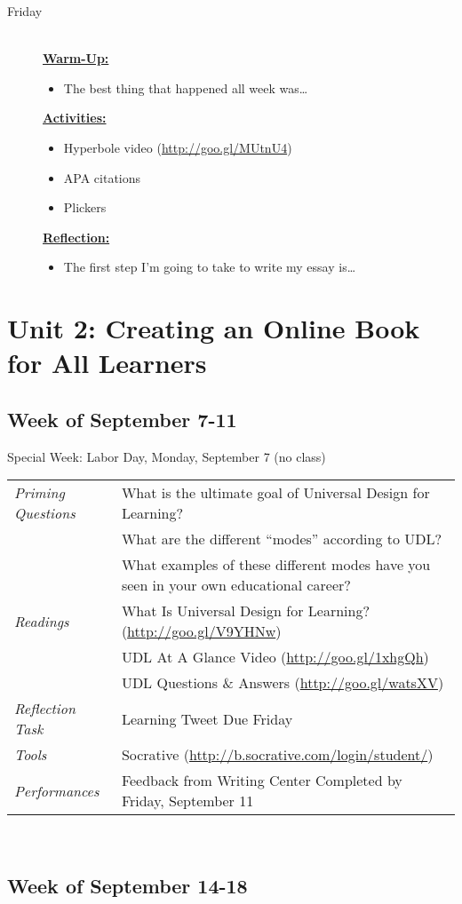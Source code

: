 \documentclass{tufte-handout}
\newcommand{\tabpq}{\faQuestionCircle\medspace\textit{Priming Questions}}
\newcommand{\tabread}{\faBook\medspace\textit{Readings}}
\newcommand{\tabperformance}{\faTasks\medspace\textit{Performances}}
\newcommand{\tabtools}{\faWrench\medspace\textit{Tools}}
\newcommand{\tabtweet}{\faLightbulbO\medspace\textit{Reflection Task} & Learning Tweet Due Friday \\}
\newenvironment{tabsched}
	{\small
	\begin{tabular}{p{1.5in}p{4.5in}}
	\toprule}
	{\bottomrule
	\end{tabular}
	\normalsize\\}
\newenvironment{specweek}
	{\begin{center}
		\fontseries{b} \faBullhorn \medspace Special Week: }
		{\medspace \faBullhorn \fontseries{m}
	\end{center}}
\newcommand{\weekfour}{September 7-11}
\newcommand{\weekfive}{September 14-18}
\newcommand{\laborday}{Labor Day, Monday, September 7 (no class)}
\newcommand{\listfri}{\item[Friday] \hfill \\}
\newenvironment{daywu}
	{\textbf{\underline{Warm-Up:}} \hfill \\
	\begin{itemize}}
	{\end{itemize}}
\newenvironment{dayact}
	{\textbf{\underline{Activities:}} \hfill \\
	\begin{itemize}}
	{\end{itemize}}
\newenvironment{dayref}
	{\textbf{\underline{Reflection:}} \hfill \\
	\begin{itemize}}
	{\end{itemize}}
\newenvironment{weeksched}
	{\noindent
	\begin{description}}
	{\end{description}
	\newpage}
\begin{document}
\begin{fullwidth}
\begin{weeksched}
\listfri
	\begin{daywu}
		\item The best thing that happened all week was\ldots
	\end{daywu}
	\begin{dayact}
		\item Hyperbole video (\url{http://goo.gl/MUtnU4})
		\item APA citations
		\item Plickers
	\end{dayact}
	\begin{dayref}
		\item The first step I'm going to take to write my essay is\ldots
	\end{dayref}
\end{weeksched}

\section{Unit 2: Creating an Online Book for All Learners}

\subsection{Week of \weekfour}

\begin{specweek}\laborday\end{specweek}

\begin{tabsched}
	\tabpq & What is the ultimate goal of Universal Design for Learning? \\
	& What are the different \enquote{modes} according to UDL? \\
	& What examples of these different modes have you seen in your own educational career? \\
	\midrule
	\tabread & What Is Universal Design for Learning? (\url{http://goo.gl/V9YHNw}) \\
	& UDL At A Glance Video (\url{http://goo.gl/1xhgQh}) \\
	& UDL Questions \& Answers (\url{http://goo.gl/watsXV}) \\
	\midrule
	\tabtweet
	\midrule
	\tabtools & Socrative (\url{http://b.socrative.com/login/student/}) \\
	\midrule
	\tabperformance & Feedback from Writing Center Completed by Friday, September 11 \\
\end{tabsched}
\newpage
\subsection{Week of \weekfive}


\end{fullwidth}
\end{document}

